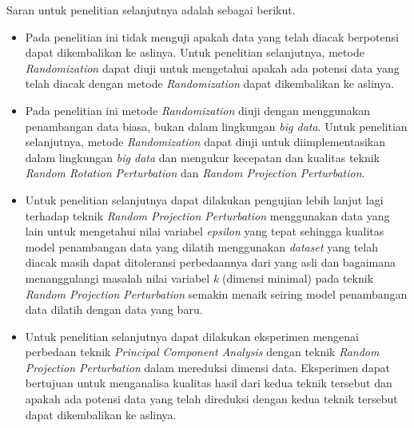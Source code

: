 Saran untuk penelitian selanjutnya adalah sebagai berikut.
\begin{itemize}
    \item Pada penelitian ini tidak menguji apakah data yang telah diacak berpotensi dapat dikembalikan ke aslinya. Untuk penelitian selanjutnya, metode \textit{Randomization} dapat diuji untuk mengetahui apakah ada potensi data yang telah diacak dengan metode \textit{Randomization} dapat dikembalikan ke aslinya.
    \item Pada penelitian ini metode \textit{Randomization} diuji dengan menggunakan penambangan data biasa, bukan dalam lingkungan \textit{big data}. Untuk penelitian selanjutnya, metode \textit{Randomization} dapat diuji untuk diimplementasikan dalam lingkungan \textit{big data} dan mengukur kecepatan dan kualitas teknik \textit{Random Rotation Perturbation} dan \textit{Random Projection Perturbation}.
    \item Untuk penelitian selanjutnya dapat dilakukan pengujian lebih lanjut lagi terhadap teknik \textit{Random Projection Perturbation} menggunakan data yang lain untuk mengetahui nilai variabel \textit{epsilon} yang tepat sehingga kualitas model penambangan data yang dilatih menggunakan \textit{dataset} yang telah diacak masih dapat ditoleransi perbedaannya dari yang asli dan bagaimana menanggulangi masalah nilai variabel \textit{k} (dimensi minimal) pada teknik \textit{Random Projection Perturbation} semakin menaik seiring model penambangan data dilatih dengan data yang baru.
    \item Untuk penelitian selanjutnya dapat dilakukan eksperimen mengenai perbedaan teknik \textit{Principal Component Analysis} dengan teknik \textit{Random Projection Perturbation} dalam mereduksi dimensi data. Eksperimen dapat bertujuan untuk menganalisa kualitas hasil dari kedua teknik tersebut dan apakah ada potensi data yang telah direduksi dengan kedua teknik tersebut dapat dikembalikan ke aslinya.
\end{itemize}
